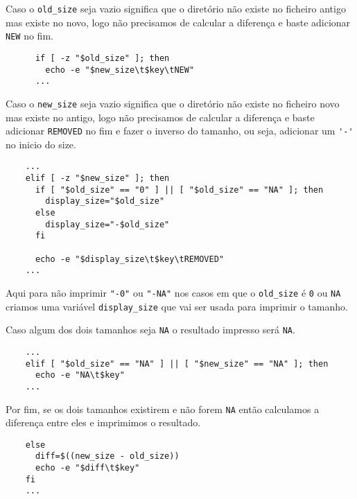 {Caso o \Verb|old_size| seja vazio significa que o diretório não existe no ficheiro antigo mas existe no novo, logo não precisamos de calcular a diferença e baste adicionar \Verb|NEW| no fim.

\begin{listing}[H]
	\centering
	\begin{verbatim}
      if [ -z "$old_size" ]; then
        echo -e "$new_size\t$key\tNEW"
      ...
  \end{verbatim}
\end{listing}

Caso o \Verb|new_size| seja vazio significa que o diretório não existe no ficheiro novo mas existe no antigo, logo não precisamos de calcular a diferença e baste adicionar \Verb|REMOVED| no fim e fazer o inverso do tamanho, ou seja, adicionar um \Verb|'-'| no inicio do size.

\begin{listing}[H]
	\centering
	\begin{verbatim}
    ...
    elif [ -z "$new_size" ]; then
      if [ "$old_size" == "0" ] || [ "$old_size" == "NA" ]; then
        display_size="$old_size"
      else
        display_size="-$old_size"
      fi

      echo -e "$display_size\t$key\tREMOVED"
    ...
  \end{verbatim}
\end{listing}

Aqui para não imprimir \Verb|"-0"| ou \Verb|"-NA"| nos casos em que o \Verb|old_size| é \Verb|0| ou \Verb|NA| criamos uma variável \Verb|display_size| que vai ser usada para imprimir o tamanho.

Caso algum dos dois tamanhos seja \Verb|NA| o resultado impresso será \Verb|NA|.

\begin{listing}[H]
	\centering
	\begin{verbatim}
    ...
    elif [ "$old_size" == "NA" ] || [ "$new_size" == "NA" ]; then
      echo -e "NA\t$key"
    ...
  \end{verbatim}
\end{listing}

Por fim, se os dois tamanhos existirem e não forem \Verb|NA| então calculamos a diferença entre eles e imprimimos o resultado.

\begin{listing}[H]
	\centering
	\begin{verbatim}
    else
      diff=$((new_size - old_size))
      echo -e "$diff\t$key"
    fi
    ...
  \end{verbatim}
\end{listing}

}

